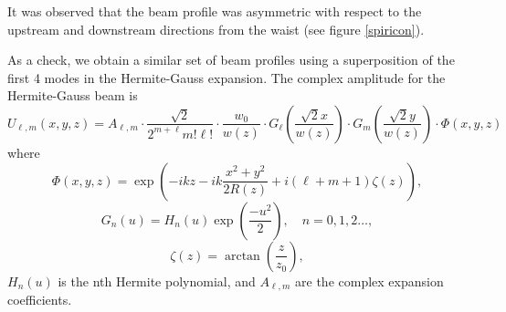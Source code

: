 It was observed that the beam profile was asymmetric with respect to the upstream and downstream directions from the waist (see figure \ref{spiricon}).

As a check, we obtain a similar set of beam profiles using a superposition of the first 4 modes in the Hermite-Gauss expansion. The complex amplitude for the Hermite-Gauss beam is \cite{Siegman:1986a}
\begin{equation}
U_{\ell,m}(x,y,z)
=
A_{\ell,m}
\cdot
\frac{\sqrt{2}}{2^{m+\ell}m!\ell!}
\cdot
\frac
{w_0}
{w(z)}
\cdot
G_{\ell}
\left(
\frac
{\sqrt{2}x}
{w(z)}
\right)
\cdot
G_{m}
\left(
\frac
{\sqrt{2}y}
{w(z)}
\right)
\cdot
\Phi(x,y,z)
\end{equation}
where
\begin{equation}
\Phi(x,y,z)
=
\exp{
\left(
-ikz
-
ik\frac{x^2+y^2}{2R(z)}
+
i(\ell+m+1)
\zeta(z)
\right)
},
\end{equation}
\begin{equation}
G_n(u)
=
H_n(u)
\exp
\left(
\frac
{-u^2}
{2}
\right),
\quad
n=0,1,2\ldots,
\end{equation}
\begin{equation}
\zeta(z)
=
\arctan
\left(
\frac{z}{z_0}
\right),
\end{equation}
$H_n(u)$ is the nth Hermite polynomial, and $A_{\ell,m}$ are the complex expansion coefficients.

